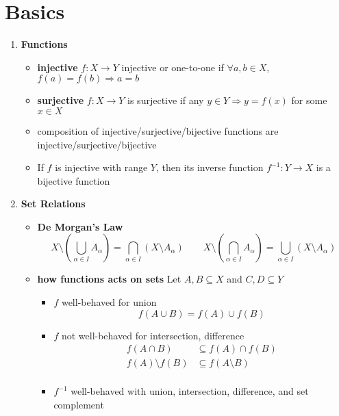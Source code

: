 \documentclass[10.5pt]{article}
\begin{document}
\tableofcontents
\newpage

\section{Basics}

\begin{enumerate}
    \item \textbf{Functions}
    \begin{itemize}
        \item \textbf{injective} $f:X\to Y$ injective or one-to-one if $\forall a,b\in X$, $f(a) = f(b) \Rightarrow a=b$
        \item \textbf{surjective} $f:X\to Y$ is surjective if any $y \in Y \Rightarrow y = f(x)$ for some $x\in X$
        \item composition of injective/surjective/bijective functions are injective/surjective/bijective
        \item If $f$ is injective with range $Y$, then its inverse function $f^{-1}: Y\to X$ is a bijective function
    \end{itemize}
    \item \textbf{Set Relations}
    \begin{itemize}
        \item \textbf{De Morgan's Law}
        \[
            X \setminus \left( \bigcup_{\alpha \in I} A_{\alpha} \right)
            = \bigcap_{\alpha \in I} \left( X \setminus A_{\alpha} \right)
            \qquad 
            X \setminus \left( \bigcap_{\alpha \in I} A_{\alpha} \right)
            = \bigcup_{\alpha \in I} \left( X \setminus A_{\alpha} \right)
        \]
        \item \textbf{how functions acts on sets} Let $A,B\subseteq X$ and $C,D\subseteq Y$
        \begin{itemize}
            \item $f$ well-behaved for union
            \[
                f(A\cup B) = f(A) \cup f(B)    
            \]
            \item $f$ not well-behaved for intersection, difference
            \begin{align*}
                f(A\cap B) &\subseteq f(A) \cap f(B) \\
                f(A) \setminus f(B) &\subseteq f(A\setminus B) \\
            \end{align*}
            \item $f^{-1}$ well-behaved with union, intersection, difference, and set complement

\end{itemize}
\end{itemize}
\end{enumerate}
\end{document}
